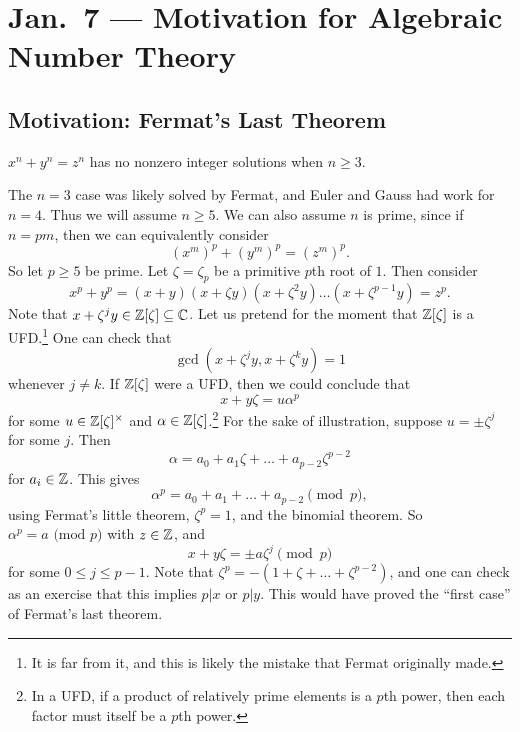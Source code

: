 \chapter{Jan.~7 --- Motivation for Algebraic Number Theory}

\section{Motivation: Fermat's Last Theorem}

\begin{theorem}
  $x^n + y^n = z^n$
  has no nonzero integer solutions when $n \ge 3$.
\end{theorem}

\begin{remark}
  The $n = 3$ case was likely solved by Fermat, and
  Euler and Gauss had work for $n = 4$. Thus we will
  assume
  $n \ge 5$. We can also assume $n$ is prime, since
  if $n = pm$, then we can equivalently consider
  \[
    (x^m)^p + (y^m)^p = (z^m)^p.
  \]
  So let $p \ge 5$ be prime. Let
  $\zeta = \zeta_p$ be a primitive $p$th root of $1$.
  Then consider
  \[
    x^p + y^p = (x + y) (x + \zeta y) (x + \zeta^2 y) \dots (x + \zeta^{p-1} y) = z^p.
  \]
  Note that $x + \zeta^j y \in \mathbb{Z}[\zeta] \subseteq \mathbb{C}$.
  Let us pretend for the moment that $\mathbb{Z}[\zeta]$ is
  a UFD.\footnote{It is far from it, and this is likely the mistake that Fermat originally made.}
  One can check that
  \[
    \gcd(x + \zeta^j y, x + \zeta^k y) = 1
  \]
  whenever $j \ne k$. If $\mathbb{Z}[\zeta]$ were a UFD, then
  we could conclude that
  \[
    x + y \zeta = u \alpha^p
  \]
  for some $u \in \mathbb{Z}[\zeta]^\times$ and
  $\alpha \in \mathbb{Z}[\zeta]$.\footnote{In a UFD, if a product of relatively prime elements is a $p$th power, then each factor must itself be a $p$th power.}
  For the sake of illustration, suppose $u = \pm \zeta^j$
  for some $j$.
  Then
  \[
    \alpha = a_0 + a_1 \zeta + \dots + a_{p - 2} \zeta^{p - 2}
  \]
  for $a_i \in \mathbb{Z}$. This gives
  \[
    \alpha^p = a_0 + a_1 + \dots + a_{p - 2} \pmod{p},
  \]
  using Fermat's little theorem, $\zeta^p = 1$,
  and the binomial theorem. So
  $\alpha^p = a \text{ (mod $p$)}$ with $z \in \mathbb{Z}$,
  and
  \[
    x + y \zeta = \pm a \zeta^j \pmod{p}
  \]
  for some $0 \le j \le p - 1$. Note that
  $\zeta^p = -(1 + \zeta + \dots + \zeta^{p - 2})$,
  and one can check as an exercise that this implies
  $p | x$ or $p | y$. This would have proved the
  ``first case'' of Fermat's last theorem.
\end{remark}

